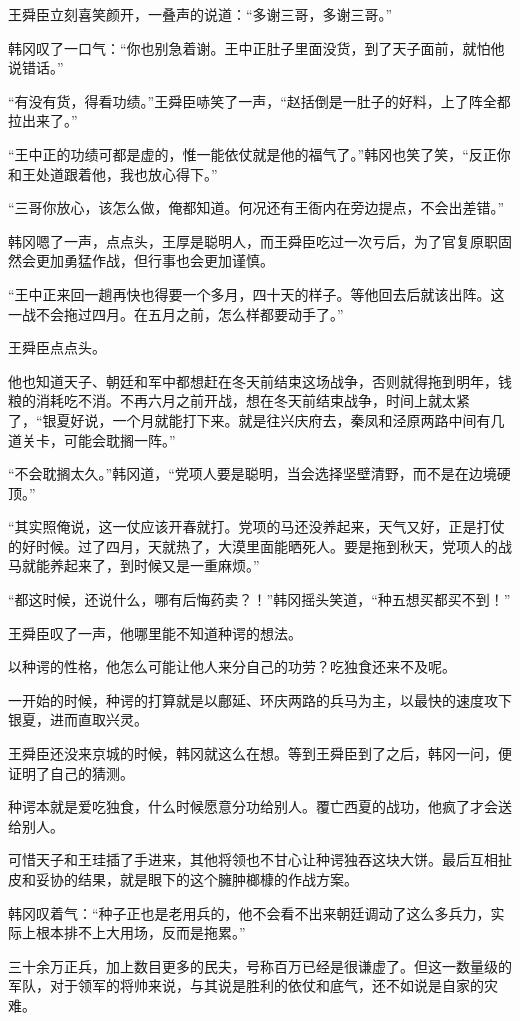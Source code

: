 王舜臣立刻喜笑颜开，一叠声的说道：“多谢三哥，多谢三哥。”

韩冈叹了一口气：“你也别急着谢。王中正肚子里面没货，到了天子面前，就怕他说错话。”

“有没有货，得看功绩。”王舜臣哧笑了一声，“赵括倒是一肚子的好料，上了阵全都拉出来了。”

“王中正的功绩可都是虚的，惟一能依仗就是他的福气了。”韩冈也笑了笑，“反正你和王处道跟着他，我也放心得下。”

“三哥你放心，该怎么做，俺都知道。何况还有王衙内在旁边提点，不会出差错。”

韩冈嗯了一声，点点头，王厚是聪明人，而王舜臣吃过一次亏后，为了官复原职固然会更加勇猛作战，但行事也会更加谨慎。

“王中正来回一趟再快也得要一个多月，四十天的样子。等他回去后就该出阵。这一战不会拖过四月。在五月之前，怎么样都要动手了。”

王舜臣点点头。

他也知道天子、朝廷和军中都想赶在冬天前结束这场战争，否则就得拖到明年，钱粮的消耗吃不消。不再六月之前开战，想在冬天前结束战争，时间上就太紧了，“银夏好说，一个月就能打下来。就是往兴庆府去，秦凤和泾原两路中间有几道关卡，可能会耽搁一阵。”

“不会耽搁太久。”韩冈道，“党项人要是聪明，当会选择坚壁清野，而不是在边境硬顶。”

“其实照俺说，这一仗应该开春就打。党项的马还没养起来，天气又好，正是打仗的好时候。过了四月，天就热了，大漠里面能晒死人。要是拖到秋天，党项人的战马就能养起来了，到时候又是一重麻烦。”

“都这时候，还说什么，哪有后悔药卖？！”韩冈摇头笑道，“种五想买都买不到！”

王舜臣叹了一声，他哪里能不知道种谔的想法。

以种谔的性格，他怎么可能让他人来分自己的功劳？吃独食还来不及呢。

一开始的时候，种谔的打算就是以鄜延、环庆两路的兵马为主，以最快的速度攻下银夏，进而直取兴灵。

王舜臣还没来京城的时候，韩冈就这么在想。等到王舜臣到了之后，韩冈一问，便证明了自己的猜测。

种谔本就是爱吃独食，什么时候愿意分功给别人。覆亡西夏的战功，他疯了才会送给别人。

可惜天子和王珪插了手进来，其他将领也不甘心让种谔独吞这块大饼。最后互相扯皮和妥协的结果，就是眼下的这个臃肿榔槺的作战方案。

韩冈叹着气：“种子正也是老用兵的，他不会看不出来朝廷调动了这么多兵力，实际上根本排不上大用场，反而是拖累。”

三十余万正兵，加上数目更多的民夫，号称百万已经是很谦虚了。但这一数量级的军队，对于领军的将帅来说，与其说是胜利的依仗和底气，还不如说是自家的灾难。

